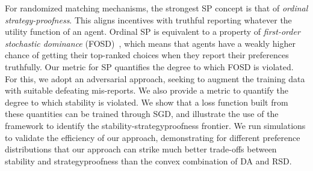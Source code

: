 \documentclass[11pt,letterpaper]{article}
\theoremstyle{definition}
\newcommand{\kibitz}[2]{\ifnum\Comments=1{\color{#1}{#2}}\fi}
\newcommand{\dcp}[1]{\kibitz{orange}{[DCP: #1]}}
\begin{document}
%
%
For randomized matching mechanisms, the strongest SP concept is that of {\em ordinal strategy-proofness}. This aligns incentives with truthful reporting whatever the utility function of an agent. Ordinal SP is equivalent to a property of {\em first-order stochastic dominance} (FOSD)~\cite{Erdil14}, which means that agents have a weakly higher chance of getting their top-ranked choices when they report their preferences truthfully. %
%
Our metric for SP  quantifies the degree to which FOSD is violated. 
For this, we adopt an adversarial approach, seeking to augment the training data with suitable defeating mis-reports. We also provide a metric to quantify the degree to which stability is violated. 
We show that a loss function built from these quantities can be trained through SGD,
and illustrate the use of the framework 
to identify the stability-strategyproofness frontier. 
%
%
We run simulations to validate the efficiency of our approach, demonstrating for different preference distributions that our approach can strike much better trade-offs between stability and strategyproofness than the convex combination of DA and RSD. 



\end{document}
